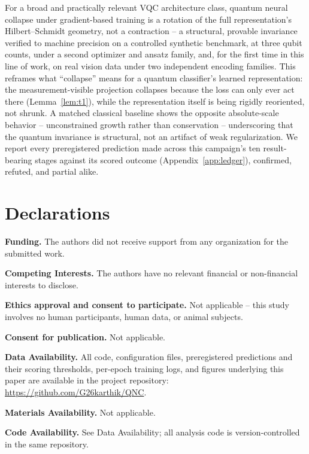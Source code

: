 \documentclass[pdflatex,sn-mathphys-ay]{sn-jnl}
\theoremstyle{thmstyleone}
\theoremstyle{thmstyletwo}
\begin{document}
For a broad and practically relevant VQC architecture class, quantum neural collapse under gradient-based training is a rotation of the full representation's Hilbert--Schmidt geometry, not a contraction -- a structural, provable invariance verified to machine precision on a controlled synthetic benchmark, at three qubit counts, under a second optimizer and ansatz family, and, for the first time in this line of work, on real vision data under two independent encoding families. This reframes what ``collapse'' means for a quantum classifier's learned representation: the measurement-visible projection collapses because the loss can only ever act there (Lemma~\ref{lem:t1}), while the representation itself is being rigidly reoriented, not shrunk. A matched classical baseline shows the opposite absolute-scale behavior -- unconstrained growth rather than conservation -- underscoring that the quantum invariance is structural, not an artifact of weak regularization. We report every preregistered prediction made across this campaign's ten result-bearing stages against its scored outcome (Appendix~\ref{app:ledger}), confirmed, refuted, and partial alike.

\backmatter

\section*{Declarations}

\textbf{Funding.} The authors did not receive support from any organization for the submitted work.

\textbf{Competing Interests.} The authors have no relevant financial or non-financial interests to disclose.

\textbf{Ethics approval and consent to participate.} Not applicable -- this study involves no human participants, human data, or animal subjects.

\textbf{Consent for publication.} Not applicable.

\textbf{Data Availability.} All code, configuration files, preregistered predictions and their scoring thresholds, per-epoch training logs, and figures underlying this paper are available in the project repository: \url{https://github.com/G26karthik/QNC}.

\textbf{Materials Availability.} Not applicable.

\textbf{Code Availability.} See Data Availability; all analysis code is version-controlled in the same repository.
\end{document}
